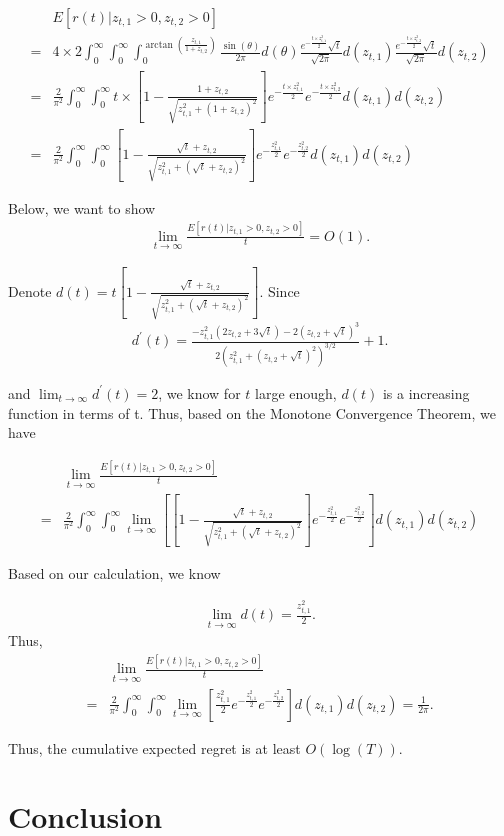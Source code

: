 \documentclass{article}
\begin{document}
\begin{align}
&E[r(t)| z_{t,1}>0, z_{t,2}>0] \nonumber \\
=& 4\times 2 \int_{0}^{\infty} \int_{0}^{\infty} \int_{0}^{\arctan\left(\frac{z_{t,1}}{1+z_{t,2}}\right)}\frac{\sin(\theta)}{2\pi}d(\theta)\frac{e^{-\frac{t \times z_{t,1}^2}{2}}\sqrt{t}}{\sqrt{2\pi}}d(z_{t,1})\frac{e^{-\frac{t \times z_{t,2}^2}{2}}\sqrt{t}}{\sqrt{2\pi}}d(z_{t,2}) \nonumber \\
=& \frac{2}{\pi^2}\int_{0}^{\infty} \int_{0}^{\infty}t\times \left[1-\frac{1+z_{t,2}}{\sqrt{z_{t,1}^2+(1+z_{t,2})^2}}\right]e^{-\frac{t \times z_{t,1}^2}{2}}e^{-\frac{t \times z_{t,2}^2}{2}}d(z_{t,1})d(z_{t,2}) \nonumber \\
=& \frac{2}{\pi^2}\int_{0}^{\infty} \int_{0}^{\infty} \left[1-\frac{\sqrt{t}+z_{t,2}}{\sqrt{z_{t,1}^2+(\sqrt{t}+z_{t,2})^2}}\right]e^{-\frac{z_{t,1}^2}{2}}e^{-\frac{z_{t,2}^2}{2}}d(z_{t,1})d(z_{t,2}) \nonumber 
\end{align}

Below, we want to show 
\begin{align}
\lim_{t\rightarrow\infty}\frac{E[r(t)| z_{t,1}>0, z_{t,2}>0]}{t} = O(1). \nonumber
\end{align}

Denote $d(t)=t\left[1-\frac{\sqrt{t}+z_{t,2}}{\sqrt{z_{t,1}^2+(\sqrt{t}+z_{t,2})^2}}\right]$.
Since
\begin{align}
d^{'}(t)=\frac{-z_{t,1}^2(2z_{t,2}+3\sqrt{t})-2(z_{t,2}+\sqrt{t})^3}{2(z_{t,1}^2+(z_{t,2}+\sqrt{t})^2)^{3/2}}+1. \nonumber
\end{align}

and $\lim_{t\rightarrow \infty}d^{'}(t)=2$, we know for $t$ large enough, $d(t)$ is a increasing function in terms of t. Thus, based on the Monotone Convergence Theorem, we have

\begin{align}
&\lim_{t\rightarrow \infty}\frac{E[r(t)| z_{t,1}>0, z_{t,2}>0]}{t} \nonumber \\
=& \frac{2}{\pi^2}\int_{0}^{\infty} \int_{0}^{\infty}\lim_{t\rightarrow \infty}\left[ \left[1-\frac{\sqrt{t}+z_{t,2}}{\sqrt{z_{t,1}^2+(\sqrt{t}+z_{t,2})^2}}\right]e^{-\frac{z_{t,1}^2}{2}}e^{-\frac{z_{t,2}^2}{2}}\right]d(z_{t,1})d(z_{t,2}) \nonumber  
\end{align}

Based on our calculation, we know

\begin{align}
\lim_{t\rightarrow \infty} d(t)=\frac{z_{t,1}^2}{2}. \nonumber
\end{align}
Thus,
\begin{align}
&\lim_{t\rightarrow \infty}\frac{E[r(t)| z_{t,1}>0, z_{t,2}>0]}{t} \nonumber \\
=&\frac{2}{\pi^2}\int_{0}^{\infty} \int_{0}^{\infty}\lim_{t\rightarrow \infty}\left[ \frac{z_{t,1}^2}{2}e^{-\frac{z_{t,1}^2}{2}}e^{-\frac{z_{t,2}^2}{2}}\right]d(z_{t,1})d(z_{t,2}) = \frac{1}{2\pi}. \nonumber
\end{align}


Thus, the cumulative expected regret is at least $O(\log(T))$.


\section{Conclusion}


{}

\end{document}
